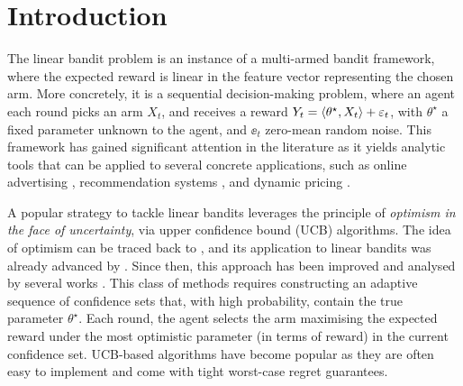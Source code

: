 \section{Introduction}
The linear bandit problem \citep{abe1999associative, auer2003using} is an instance of a multi-armed bandit framework, 
where the expected reward is linear in the feature vector representing the chosen arm. More concretely, it is a 
sequential decision-making problem, where an agent each round picks an arm $X_t$, and receives a reward $Y_t = 
\langle\theta^\star,X_t\rangle + \varepsilon_t$, with $\theta^\star$ a fixed parameter unknown to the agent, and $\ee_t$ zero-mean 
random noise. This framework has gained significant attention in the literature as it yields analytic tools that can be 
applied to several concrete applications, such as online advertising \citep{abe2003reinforcement}, recommendation 
systems \citep{li2010contextual, korkut2021disposable}, and dynamic pricing \citep{cohen2020feature}. 

A popular strategy to tackle linear bandits leverages the principle of \emph{optimism in the face of uncertainty}, via 
upper confidence bound (UCB) algorithms. The idea of optimism can be traced back to \citet{lai1985asymptotically}, and 
its application to linear bandits was already advanced by \citet{auer2003using}. Since then, this approach has been 
improved and analysed by several works \citep{abbasi2011improved, lattimore2020bandit, flynn2023improved}. This class of 
methods requires constructing an adaptive sequence of confidence sets that, with high probability, contain the true 
parameter $\theta^\star$. Each round, the agent selects the arm maximising the expected reward under the most optimistic 
parameter (in terms of reward) in the current confidence set. UCB-based algorithms have become popular as they are often 
easy to implement and come with tight worst-case regret guarantees. 

